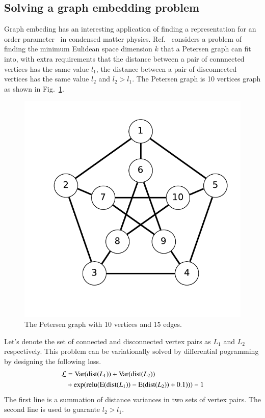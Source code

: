 \documentclass[aps,twocolumn,longbibliography,english,superscriptaddress]{revtex4-1}
\newcommand{\<}{\langle}
\renewcommand{\>}{\rangle}
\newcommand{\Var}{{\mathrm{Var}}}
\newcommand{\Mean}{{\mathrm{E}}}
\newcommand{\Fig}[1]{Fig.~\ref{#1}}
\newcommand{\Ref}[1]{Ref.~\onlinecite{#1}}
\theoremstyle{definition}\newtheorem{definition}{\textit{Definition}}
\begin{document}
\subsection{Solving a graph embedding problem}\label{sec:graph}
Graph embeding has an interesting application of finding a representation for an order parameter~\cite{Takahashi2020} in condensed matter physics.
\Ref{Takahashi2020} considers a problem of finding the minimum Eulidean space dimension $k$ that a Petersen graph can fit into, with extra requirements that the distance between a pair of connnected vertices has the same value $l_1$, the distance between a pair of disconnected vertices has the same value $l_2$ and $l_2 > l_1$.
The Petersen graph is 10 vertices graph as shown in \Fig{fig:petersen}.
\begin{figure}
    \centerline{\includegraphics[width=0.6\columnwidth,trim={0 1cm 0 0},clip]{images/petersen.pdf}}
    \caption{The Petersen graph with 10 vertices and 15 edges.}\label{fig:petersen}
\end{figure}
Let's denote the set of connected and disconnected vertex pairs as $L_1$ and $L_2$ respectively. This problem can be variationally solved by differential pogramming by designing the following loss.
\begin{align}
    \begin{split}
        \mathcal{L} &= \Var({\rm dist}(L_1)) + \Var({\rm dist}(L_2)) \\
        &+\exp({\rm relu}(\Mean({\rm dist}(L_1)) - \Mean({\rm dist}(L_2)) + 0.1))) - 1
    \end{split}
\end{align}
The first line is a summation of distance variances in two sets of vertex pairs. The second line is used to guarante $l_2 > l_1$.
\end{document}
